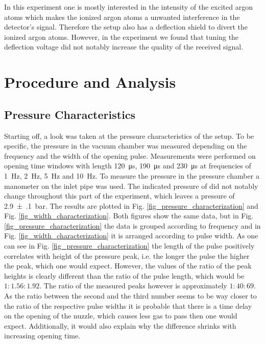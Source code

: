 \documentclass[a4paper,10pt]{article}
\begin{document}
In this experiment one is mostly interested in the intensity of the excited argon atoms which makes the ionized argon atoms a unwanted interference in the detector's signal. Therefore the setup also has a deflection shield to divert the ionized argon atoms. However, in the experiment we found that tuning the deflection voltage did not notably increase the quality of the received signal.

\section{Procedure and Analysis}
\subsection{Pressure Characteristics}
Starting off, a look was taken at the pressure characteristics of the setup. To be specific, the pressure in the vacuum chamber was measured depending on the frequency and the width of the opening pulse. Measurements were performed on opening time windows with length \SI{120}{\micro \s}, \SI{190}{\micro \s} and \SI{230}{\micro \s} at frequencies of \SI{1}{\hertz}, \SI{2}{\hertz}, \SI{5}{\hertz} and \SI{10}{\hertz}. To measure the pressure in the pressure chamber a manometer on the inlet pipe was used. The indicated pressure of did not notably change throughout this part of the experiment, which leaves a pressure of \SI{2.9(1)}{\bar}. The results are plotted in Fig. \ref{fig_pressure_characterization} and Fig. \ref{fig_width_characterization}. Both figures show the same data, but in Fig. \ref{fig_pressure_characterization} the data is grouped according to frequency and in Fig. \ref{fig_width_characterization} it is arranged according to pulse width. As one can see in Fig. \ref{fig_pressure_characterization} the length of the pulse positively correlates with height of the pressure peak, i.e. the longer the pulse the higher the peak, which one would expect. However, the values of the ratio of the peak heights is clearly different than the ratio of the pulse length, which would be $1:1.56:1.92$. The ratio of the measured peaks however is approximately $1:40:69$. As the ratio between the second and the third number seems to be way closer to the ratio of the respective pulse widths it is probable that there is a time delay on the opening of the nuzzle, which causes less gas to pass then one would expect. Additionally, it would also explain why the difference shrinks with increasing opening time. 
\end{document}
